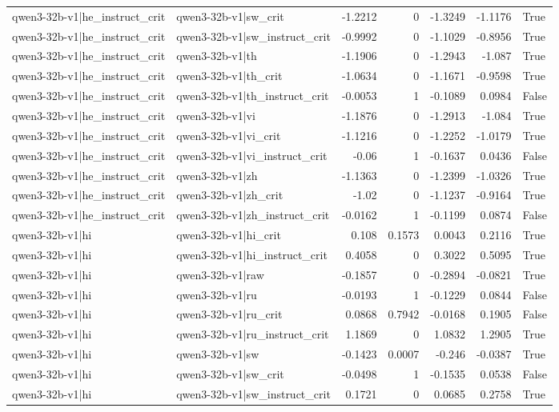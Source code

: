 \begin{table}
\begin{tabular}{l l r r r r l}
qwen3-32b-v1|he_instruct_crit & qwen3-32b-v1|sw_crit & -1.2212 & 0 & -1.3249 & -1.1176 & True \\
qwen3-32b-v1|he_instruct_crit & qwen3-32b-v1|sw_instruct_crit & -0.9992 & 0 & -1.1029 & -0.8956 & True \\
qwen3-32b-v1|he_instruct_crit & qwen3-32b-v1|th & -1.1906 & 0 & -1.2943 & -1.087 & True \\
qwen3-32b-v1|he_instruct_crit & qwen3-32b-v1|th_crit & -1.0634 & 0 & -1.1671 & -0.9598 & True \\
qwen3-32b-v1|he_instruct_crit & qwen3-32b-v1|th_instruct_crit & -0.0053 & 1 & -0.1089 & 0.0984 & False \\
qwen3-32b-v1|he_instruct_crit & qwen3-32b-v1|vi & -1.1876 & 0 & -1.2913 & -1.084 & True \\
qwen3-32b-v1|he_instruct_crit & qwen3-32b-v1|vi_crit & -1.1216 & 0 & -1.2252 & -1.0179 & True \\
qwen3-32b-v1|he_instruct_crit & qwen3-32b-v1|vi_instruct_crit & -0.06 & 1 & -0.1637 & 0.0436 & False \\
qwen3-32b-v1|he_instruct_crit & qwen3-32b-v1|zh & -1.1363 & 0 & -1.2399 & -1.0326 & True \\
qwen3-32b-v1|he_instruct_crit & qwen3-32b-v1|zh_crit & -1.02 & 0 & -1.1237 & -0.9164 & True \\
qwen3-32b-v1|he_instruct_crit & qwen3-32b-v1|zh_instruct_crit & -0.0162 & 1 & -0.1199 & 0.0874 & False \\
qwen3-32b-v1|hi & qwen3-32b-v1|hi_crit & 0.108 & 0.1573 & 0.0043 & 0.2116 & True \\
qwen3-32b-v1|hi & qwen3-32b-v1|hi_instruct_crit & 0.4058 & 0 & 0.3022 & 0.5095 & True \\
qwen3-32b-v1|hi & qwen3-32b-v1|raw & -0.1857 & 0 & -0.2894 & -0.0821 & True \\
qwen3-32b-v1|hi & qwen3-32b-v1|ru & -0.0193 & 1 & -0.1229 & 0.0844 & False \\
qwen3-32b-v1|hi & qwen3-32b-v1|ru_crit & 0.0868 & 0.7942 & -0.0168 & 0.1905 & False \\
qwen3-32b-v1|hi & qwen3-32b-v1|ru_instruct_crit & 1.1869 & 0 & 1.0832 & 1.2905 & True \\
qwen3-32b-v1|hi & qwen3-32b-v1|sw & -0.1423 & 0.0007 & -0.246 & -0.0387 & True \\
qwen3-32b-v1|hi & qwen3-32b-v1|sw_crit & -0.0498 & 1 & -0.1535 & 0.0538 & False \\
qwen3-32b-v1|hi & qwen3-32b-v1|sw_instruct_crit & 0.1721 & 0 & 0.0685 & 0.2758 & True \\

\end{tabular}
\end{table}
